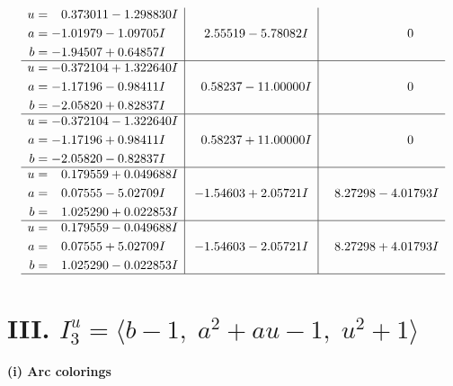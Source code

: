 \documentclass[1p]{elsarticle_modified}
\theoremstyle{definition}
\begin{document}
$$\begin{array}{c|c|c}
\begin{aligned}
u &= \phantom{-}0.373011 - 1.298830 I \\
a &= -1.01979 - 1.09705 I \\
b &= -1.94507 + 0.64857 I\end{aligned}
 & \phantom{-}2.55519 - 5.78082 I & \phantom{-0.000000 } 0 \\ \hline\begin{aligned}
u &= -0.372104 + 1.322640 I \\
a &= -1.17196 - 0.98411 I \\
b &= -2.05820 + 0.82837 I\end{aligned}
 & \phantom{-}0.58237 - 11.00000 I & \phantom{-0.000000 } 0 \\ \hline\begin{aligned}
u &= -0.372104 - 1.322640 I \\
a &= -1.17196 + 0.98411 I \\
b &= -2.05820 - 0.82837 I\end{aligned}
 & \phantom{-}0.58237 + 11.00000 I & \phantom{-0.000000 } 0 \\ \hline\begin{aligned}
u &= \phantom{-}0.179559 + 0.049688 I \\
a &= \phantom{-}0.07555 - 5.02709 I \\
b &= \phantom{-}1.025290 + 0.022853 I\end{aligned}
 & -1.54603 + 2.05721 I & \phantom{-}8.27298 - 4.01793 I \\ \hline\begin{aligned}
u &= \phantom{-}0.179559 - 0.049688 I \\
a &= \phantom{-}0.07555 + 5.02709 I \\
b &= \phantom{-}1.025290 - 0.022853 I\end{aligned}
 & -1.54603 - 2.05721 I & \phantom{-}8.27298 + 4.01793 I\\
 \hline 
 \end{array}$$\newpage\newpage\renewcommand{\arraystretch}{1}
\centering \section*{III. $I^u_{3}= \langle b-1,\;a^2+a u-1,\;u^2+1 \rangle$}
\flushleft \textbf{(i) Arc colorings}\\
\end{document}
